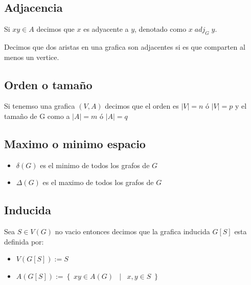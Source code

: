 \documentclass[12pt, fleqn]{report}                             %
\DeclareMathOperator \Space     {\quad}                         %
\DeclareMathOperator \MiniSpace {\;}                            %
\newcommand \Such           {\MiniSpace | \MiniSpace}           %
\theoremstyle{break}                                            %
\newcommand{\Set}[1]            {\left\{ \; #1 \; \right\}}     %
\begin{document}
            \subsection{Adjacencia}

                Si $xy \in A$ decimos que $x$ es adyacente a $y$, denotado como $x \; adj_G \; y$.

                Decimos que dos aristas en una grafica son adjacentes si es que comparten al menos un vertice.

            \subsection{Orden o tamaño}

                Si tenemso una grafica $(V, A)$ decimos que el orden es $|V| = n$ ó $|V| = p$ y 
                el tamaño de G como a $|A| = m$ ó $|A| = q$ 

            \subsection{Maximo o minimo espacio}

                \begin{itemize}
                    \item $\delta(G)$ es el minimo de todos los grafos de $G$
                    \item $\Delta(G)$ es el maximo de todos los grafos de $G$
                \end{itemize}

            \subsection{Inducida}

                Sea $S \in V(G)$ no vacio entonces decimos que la grafica inducida $G[S]$
                esta definida por:
                \begin{itemize}
                    \item $V(G[S]) := S$
                    \item $A(G[S]) := \Set{ xy \in A(G) \Such x, y \in S}$
                \end{itemize}
\end{document}
